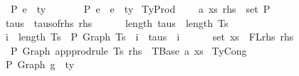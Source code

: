 \begin{isabellebody}
\ \ \ \ \ {\isasymGamma}\ {\isasymturnstile}{\isacharbraceleft}{\kern0pt}P{\isacharbraceright}{\kern0pt}\ e{}\ {\isacharcolon}{\kern0pt}\ ty{}\ {\isacharequal}{\kern0pt}{\isacharequal}{\kern0pt}{\isachargreater}{\kern0pt}\isanewline
\ \ \ \ \ {\isasymGamma}\ {\isasymturnstile}{\isacharbraceleft}{\kern0pt}P{\isacharbraceright}{\kern0pt}\ e{}\ {\isasymcdot}\ e{}\ {\isacharcolon}{\kern0pt}\ ty{}{\isachardoublequoteclose}\isanewline
{\isacharbar}{\kern0pt}\ TyProd{\isacharcolon}{\kern0pt}\isanewline
\ \ \ \ {\isachardoublequoteopen}{\isacharparenleft}{\kern0pt}{\isacharparenleft}{\kern0pt}a{\isacharcomma}{\kern0pt}\ xs{\isacharparenright}{\kern0pt}{\isacharcomma}{\kern0pt}\ rhs{\isacharparenright}{\kern0pt}\ {\isasymin}\ set\ P\ {\isacharequal}{\kern0pt}{\isacharequal}{\kern0pt}{\isachargreater}{\kern0pt}\isanewline
\ \ \ \ \ taus\ {\isacharequal}{\kern0pt}\ taus{\isacharunderscore}{\kern0pt}of{\isacharunderscore}{\kern0pt}rhs\ rhs\ {\isacharequal}{\kern0pt}{\isacharequal}{\kern0pt}{\isachargreater}{\kern0pt}\isanewline
\ \ \ \ \ length\ taus\ {\isacharequal}{\kern0pt}\ length\ Ts\ {\isacharequal}{\kern0pt}{\isacharequal}{\kern0pt}{\isachargreater}{\kern0pt}\isanewline
\ \ \ \ \ {\isacharparenleft}{\kern0pt}{\isasymforall}i\ {\isacharless}{\kern0pt}\ length\ Ts{\isachardot}{\kern0pt}\ {\isasymGamma}\ {\isasymturnstile}{\isacharbraceleft}{\kern0pt}P{\isacharbraceright}{\kern0pt}\ {\isacharparenleft}{\kern0pt}Graph\ {\isacharparenleft}{\kern0pt}Ts\ {\isacharbang}{\kern0pt}\ i{\isacharparenright}{\kern0pt}{\isacharparenright}{\kern0pt}\ {\isacharcolon}{\kern0pt}\ taus\ {\isacharbang}{\kern0pt}\ i{\isacharparenright}{\kern0pt}\ {\isacharequal}{\kern0pt}{\isacharequal}{\kern0pt}{\isachargreater}{\kern0pt}\isanewline
\ \ \ \ \ set\ xs\ {\isacharequal}{\kern0pt}\ FLrhs\ rhs\ {\isacharequal}{\kern0pt}{\isacharequal}{\kern0pt}{\isachargreater}{\kern0pt}\isanewline
\ \ \ \ \ {\isasymGamma}\ {\isasymturnstile}{\isacharbraceleft}{\kern0pt}P{\isacharbraceright}{\kern0pt}\ {\isacharparenleft}{\kern0pt}Graph\ {\isacharparenleft}{\kern0pt}app{\isacharunderscore}{\kern0pt}prodrule\ Ts\ rhs{\isacharparenright}{\kern0pt}{\isacharparenright}{\kern0pt}\ {\isacharcolon}{\kern0pt}\ TBase\ a\ xs{\isachardoublequoteclose}\isanewline
{\isacharbar}{\kern0pt}\ TyCong{\isacharcolon}{\kern0pt}\isanewline
\ \ \ \ {\isachardoublequoteopen}{\isasymGamma}\ {\isasymturnstile}{\isacharbraceleft}{\kern0pt}P{\isacharbraceright}{\kern0pt}\ Graph\ g{}\ {\isacharcolon}{\kern0pt}\ ty\ {\isacharequal}{\kern0pt}{\isacharequal}{\kern0pt}{\isachargreater}{\kern0pt}\isanewline

\end{isabellebody}
